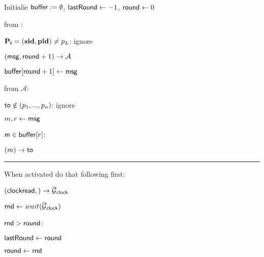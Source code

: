 \begin{bbox}[title={$\F_{\msf{bcast}} (p_L, p_1...p_n)$}]

Initialie ${\mathsf {buffer}} := \emptyset$, ${\mathsf {lastRound}} \leftarrow -1$, ${\mathsf {round}} \leftarrow 0$

\OnInput {} from \Partyi:

	\quad \If $\mathbf{P_i=(sid,pid)} \neq p_L$: ignore

	\quad \Leak $({\mathsf {msg}},{\mathsf {round}} + 1) \rightarrow \mathcal{A}$

	\quad ${\mathsf {buffer}}[{\mathsf {round}}+1] \leftarrow {\mathsf {msg}}$


\OnInput {} from $\mathcal{A}$:
	
	\quad \If ${\mathsf {to}} \notin (p_1,...,p_n)$: ignore

	\quad $m,r \leftarrow {\mathsf {msg}}$

	\quad \If ${\mathsf {m}} \in {\mathsf {buffer}}[r]$:

	\quad \quad \Send $(m) \rightarrow {\mathsf {to}}$

\vspace{2mm} \hrule \vspace{2mm}

When activated do that following first:

	\quad \Send $({\mathsf {clockread}},) \rightarrow {\overline{\mathcal{G}}}_{{\mathsf {clock}}}$

	\quad ${\mathsf {rnd}} \leftarrow wait({\overline{\mathcal{G}}}_{{\mathsf {clock}}})$

	\quad \If ${\mathsf {rnd}} > {\mathsf {round}}$:

	\quad \quad ${\mathsf {lastRound}} \leftarrow {\mathsf {round}}$
	
	\quad \quad ${\mathsf {round}} \leftarrow {\mathsf {rnd}}$

\end{bbox}
